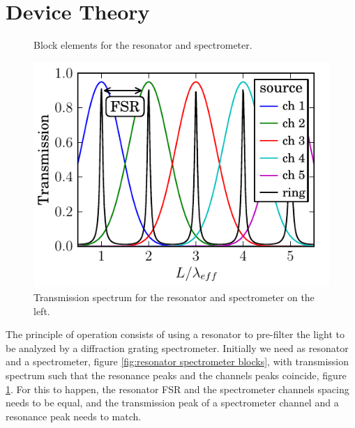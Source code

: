 \documentclass[12pt,twoside,english]{book}
\renewcommand{\~}{\perispomeni}%
\numberwithin{equation}{section}
\numberwithin{figure}{section}
\begin{document}
\section{Device Theory}
\begin{figure}[h]
	\begin{minipage}[t]{0.49\columnwidth}%
	
	\caption{Block elements for the resonator and spectrometer.}
	\label{fig:resonator spectrometer blocks}
	\end{minipage}\hfill%
	\begin{minipage}[t]{0.49\columnwidth}%
	\includegraphics{ring-enhaced-sep}
	\caption{Transmission spectrum for the resonator and spectrometer on the left.}
	\label{fig:spectrum resonator spectrometer}
	\end{minipage}
\end{figure}
The principle of operation consists of using a resonator to pre-filter the light to be analyzed by a diffraction grating spectrometer. Initially we need as resonator and a spectrometer, figure \ref{fig:resonator spectrometer blocks}, with transmission spectrum such that the resonance peaks and the channels peaks coincide, figure \ref{fig:spectrum resonator spectrometer}. For this to happen, the resonator FSR and the spectrometer channels spacing needs to be equal, and the transmission peak of a spectrometer channel and a resonance peak needs to match.
\end{document}
